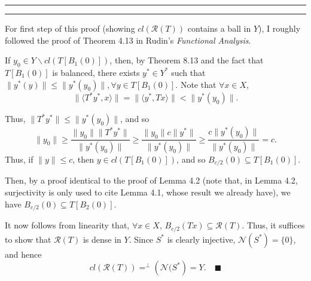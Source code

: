 \documentclass[11pt]{article}
\newcounter{questionCounter}
\newcounter{partCounter}[questionCounter]
\newenvironment{question}[2][\arabic{questionCounter}]{%
    \setcounter{partCounter}{0}%
    \vspace{.25in} \hrule \vspace{0.5em}%
        \noindent{\bf #2}%
    \vspace{0.8em} \hrule \vspace{.10in}%
    \addtocounter{questionCounter}{1}%
}{}
\newcommand{\mqed}{\quad \blacksquare}
\newcommand{\sminus}{\backslash}
\newcommand{\Ran}{\mathcal{R}} %
\newcommand{\Nul}{\mathcal{N}} %
\begin{document}
\begin{question}{Problem 8}
For first step of this proof (showing $cl(\Ran(T))$ contains a ball in $Y$), I
roughly followed the proof of Theorem 4.13 in Rudin's
\emph{Functional Analysis}.

If $y_0 \in Y \sminus cl(T[B_1(0)])$, then, by Theorem 8.13 and the fact that
$T[B_1(0)]$ is balanced, there exists $y^* \in Y^*$ such that
$\|y^*(y)\| \leq \|y^*(y_0)\|, \forall y \in T[B_1(0)]$. Note that
$\forall x \in X$,
\[\|\langle T^*y^*, x \rangle\|
    = \|\langle y^*, Tx \rangle\|
    < \|y^*(y_0)\|.
\]

Thus, $\|T^*y^*\| \leq \|y^*(y_0)\|$, and so
\[\|y_0\|
    \geq \frac{\|y_0\|\|T^*y^*\|}{\|y^*(y_0)\|}
    \geq \frac{\|y_0\| c\|y^*\|}{\|y^*(y_0)\|}
    \geq \frac{c\|y^*(y_0)\|}{\|y^*(y_0)\|}
    = c.
\]
Thus, if $\|y\| \leq c$, then $y \in cl(T[B_1(0)])$, and so
$B_{c/2}(0) \subseteq T[B_1(0)]$.

Then, by a proof identical to the proof of Lemma 4.2 (note that, in Lemma 4.2,
surjectivity is only used to cite Lemma 4.1, whose result we already have), we
have $B_{c/2}(0) \subseteq T[B_2(0)]$.

It now follows from linearity that, $\forall x \in X$,
$B_{c/2}(Tx) \subseteq \Ran(T)$. Thus, it suffices to show that $\Ran(T)$ is dense
in $Y$. Since $S^*$ is clearly injective, $\Nul(S^*) = \{0\}$, and hence
\[cl(\Ran(T)) = ^\perp \left( \Nul(S^* \right) = Y. \mqed\]
\end{question}
\end{document}
